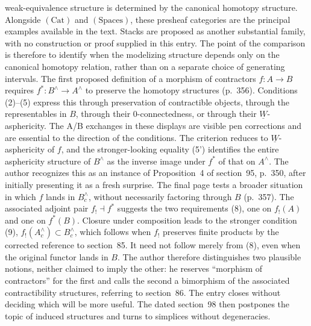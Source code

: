 \documentclass[10pt,oneside]{book}
\begin{document}
weak-equivalence structure is determined by the canonical homotopy structure. Alongside $(\mathrm{Cat})$ and $(\mathrm{Spaces})$, these presheaf categories are the principal examples available in the text. Stacks are proposed as another substantial family, with no construction or proof supplied in this entry. The point of the comparison is therefore to identify when the modelizing structure depends only on the canonical homotopy relation, rather than on a separate choice of generating intervals. The first proposed definition of a morphism of contractors $f:A\to B$ requires $f^*:B^{\wedge}\to A^{\wedge}$ to preserve the homotopy structures (p.~356). Conditions (2)--(5) express this through preservation of contractible objects, through the representables in $B$, through their 0-connectedness, or through their $\underline W$-asphericity. The A/B exchanges in these displays are visible pen corrections and are essential to the direction of the conditions. The criterion reduces to $\underline W$-asphericity of $f$, and the stronger-looking equality (5') identifies the entire asphericity structure of $B^{\wedge}$ as the inverse image under $f^*$ of that on $A^{\wedge}$. The author recognizes this as an instance of Proposition~4 of section~95, p.~350, after initially presenting it as a fresh surprise. The final page tests a broader situation in which $f$ lands in $B^{\wedge}_c$, without necessarily factoring through $B$ (p.~357). The associated adjoint pair $f_!\dashv f^*$ suggests the two requirements (8), one on $f_!(A)$ and one on $f^*(B)$. Closure under composition leads to the stronger condition (9), $f_!(A^{\wedge}_c)\subset B^{\wedge}_c$, which follows when $f_!$ preserves finite products by the corrected reference to section~85. It need not follow merely from (8), even when the original functor lands in $B$. The author therefore distinguishes two plausible notions, neither claimed to imply the other: he reserves ``morphism of contractors'' for the first and calls the second a bimorphism of the associated contractibility structures, referring to section~86. The entry closes without deciding which will be more useful. The dated section~98 then postpones the topic of induced structures and turns to simplices without degeneracies.
\end{document}
